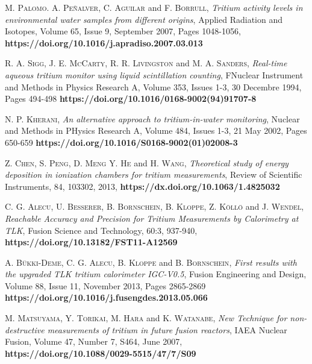 \begin{thebibliography}{100}
 \textsc{M. Palomo}. \textsc{A. Peñalver}, \textsc{C. Aguilar} and \textsc{F. Borrull},
\textit{Tritium activity levels in environmental water samples from different origins}, Applied Radiation and Isotopes, Volume 65, Issue 9, September 2007, Pages 1048-1056, \textbf{https://doi.org/10.1016/j.apradiso.2007.03.013}

 \textsc{R. A. Sigg}, \textsc{J. E. McCarty}, \textsc{R. R. Livingston} and \textsc{M. A. Sanders},
\textit{Real-time aqueous tritium monitor using liquid scintillation counting}, FNuclear Instrument and Methods in Physics Research A, Volume 353, Issues 1-3, 30 Decembre 1994, Pages 494-498 \textbf{https://doi.org/10.1016/0168-9002(94)91707-8}


 \textsc{N. P. Kherani},
\textit{An alternative approach to tritium-in-water monitoring}, Nuclear and Methods in PHysics Research A, Volume 484, Issues 1-3, 21 May 2002, Pages 650-659 \textbf{https://doi.org/10.1016/S0168-9002(01)02008-3}

 \textsc{Z. Chen}, \textsc{S. Peng}, \textsc{D. Meng} \textsc{Y. He} and \textsc{H. Wang},
\textit{Theoretical study of energy deposition in ionization chambers for tritium measurements}, Review of Scientific Instruments, 84, 103302, 2013, \textbf{https://dx.doi.org/10.1063/1.4825032}

 \textsc{C. G. Alecu}, \textsc{U. Besserer}, \textsc{B. Bornschein}, \textsc{B. Kloppe}, \textsc{Z. Köllö} and \textsc{J. Wendel},
\textit{Reachable Accuracy and Precision for Tritium Measurements by Calorimetry at TLK}, Fusion Science and Technology, 60:3, 937-940, \textbf{https://doi.org/10.13182/FST11-A12569}

 \textsc{A. Bükki-Deme}, \textsc{C. G. Alecu}, \textsc{B. Kloppe} and \textsc{B. Bornschein},
\textit{First results with the upgraded TLK tritium calorimeter IGC-V0.5}, Fusion Engineering and Design, Volume 88, Issue 11, November 2013, Pages 2865-2869 \textbf{https://doi.org/10.1016/j.fusengdes.2013.05.066}

 \textsc{M. Matsuyama}, \textsc{Y. Torikai}, \textsc{M. Hara} and \textsc{K. Watanabe},
\textit{New Technique for non-destructive measurements of tritium in future fusion reactors}, IAEA Nuclear Fusion, Volume 47, Number 7, S464, June 2007, \textbf{https://doi.org/10.1088/0029-5515/47/7/S09}


\end{thebibliography}
